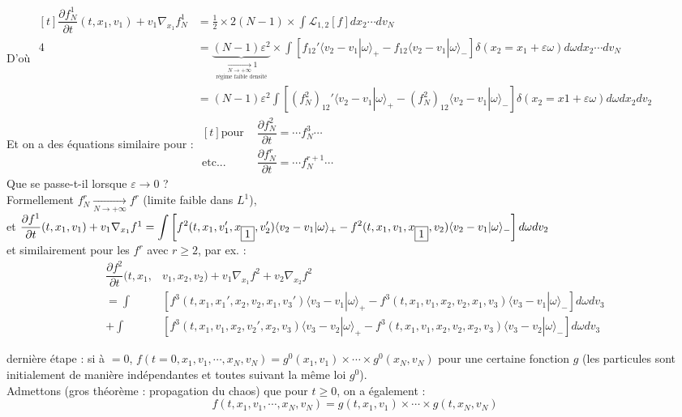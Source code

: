 \documentclass[12pt,a4paper]{article}
\begin{document}
	D'où $\begin{aligned}[t]
		\dfrac{\partial f_N^1}{\partial t}(t,x_1,v_1)+v_1\nabla_{x_1} f_N^1 
		&= \frac12 \times 2 (N-1) \times\displaystyle\int \mathcal{L}_{1,2}[f] dx_2 \cdots dv_N\\4
		&=\underbrace{(N-1)\varepsilon^2}_{\underset{\text{régime faible densité}}{\underset{N \to + \infty}{\longrightarrow} 1}}\times\displaystyle\int\left[f_{12}'\langle v_2-v_1|\omega\rangle_+ - f_{12}\langle v_2-v_1|\omega\rangle_-\right]\delta(x_2=x_1+\varepsilon\omega) d\omega dx_2\cdots dv_N\\
		&=(N-1)\varepsilon^2 \int\left[(f_N^2)_{12}'\langle v_2-v_1|\omega\rangle_+-(f_N^2)_{12}\langle v_2-v_1|\omega\rangle_-\right]\delta(x_2=x1+\varepsilon\omega) d\omega dx_2dv_2
	\end{aligned}$\\
	Et on a des équations similaire pour : $\begin{aligned}[t]
		\text{pour } & \dfrac{\partial f_N^2}{\partial t} = \cdots f_N^3 \cdots \\
		\text{etc... } & \dfrac{\partial f_N^r}{\partial t} = \cdots f_N^{r+1} \cdots
	\end{aligned}$\\
	Que se passe-t-il lorsque $\varepsilon\to 0$ ?\\
	Formellement $f_N^r \underset{N\to + \infty}{\longrightarrow} f^r$ (limite faible dans $L^1$),\\
	et $\dfrac{\partial f^1}{\partial t} (t,x_1,v_1) + v_1\nabla_{x_1}f^1 = \displaystyle\int\left[f^2(t,x_1,v_1',x_{\fbox{1}},v_2')\langle v_2-v_1|\omega\rangle_+-f^2(t,x_1,v_1,x_{\fbox{1}},v_2)\langle v_2-v_1|\omega\rangle_-\right]d\omega dv_2$\\
	et similairement pour les $f^r$ avec $r\geq 2$, par ex. :
	\[
	\begin{aligned}
		\dfrac{\partial f^2}{\partial t}(t,x_1,&v_1,x_2,v_2)+v_1\nabla_{x_1}f^2 + v_2 \nabla_{x_2}f^2\\
		= \displaystyle\int&\left[f^3(t,x_1,x_1',x_2,v_2,x_1,v_3')\langle v_3-v_1|\omega\rangle_+-f^3(t,x_1,v_1,x_2,v_2,x_1,v_3)\langle v_3-v_1|\omega\rangle_-\right]d\omega dv_3\\
		+\int&\left[f^3(t,x_1,v_1,x_2,v_2',x_2,v_3)\langle v_3-v_2|\omega\rangle_+-f^3(t,x_1,v_1,x_2,v_2,x_2,v_3)\langle v_3-v_2 |\omega\rangle_-\right]d\omega dv_3
	\end{aligned}
	\]
	
	dernière étape : si à $ = 0$, $f(t=0,x_1,v_1,\cdots,x_N,v_N) = g^0(x_1,v_1)\times\cdots\times g^0(x_N,v_N)$ pour une certaine fonction $g$ (les particules sont initialement de manière indépendantes et toutes suivant la même loi $g^0$).\\
	Admettons (gros théorème : propagation du chaos) que pour $t \geq 0$, on a également :
	\[
	f(t,x_1,v_1,\cdots,x_N,v_N) = g(t,x_1,v_1)\times\cdots\times g(t,x_N,v_N)
	\]
	
\end{document}
